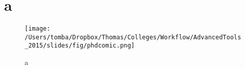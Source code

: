\documentclass[]{article}
\title{}
\author{}
\begin{document}
\maketitle

\begin{abstract}

\end{abstract}

\section{a}
\begin{figure}
	\texttt{[image: /Users/tomba/Dropbox/Thomas/Colleges/Workflow/AdvancedTools\_2015/slides/fig/phdcomic.png]}
	\caption{a}
\end{figure}
\end{document}
